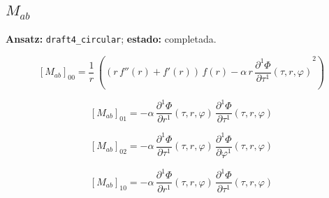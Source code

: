 \documentclass[11pt]{article}
\begin{document}
\subsection*{$ M_{ab} $}
\textbf{Ansatz:} \texttt{draft4\_circular}; \textbf{estado:} completada.\par
\begin{dmath*}[breakdepth={5}]
\left[M_{ab}\right]_{00} = \frac{1}{r}\,\left(\left(r\,f''\!\left(r\right) + f'\!\left(r\right)\right)\,f\!\left(r\right) - \alpha\,r\,{\frac{\partial^{1} \Phi}{\partial \tau^{1}}\!\left(\tau, r, \varphi\right)}^{2}\right)
\end{dmath*}
\par\smallskip
\begin{dmath*}[breakdepth={5}]
\left[M_{ab}\right]_{01} = -\alpha\,\frac{\partial^{1} \Phi}{\partial r^{1}}\!\left(\tau, r, \varphi\right)\,\frac{\partial^{1} \Phi}{\partial \tau^{1}}\!\left(\tau, r, \varphi\right)
\end{dmath*}
\par\smallskip
\begin{dmath*}[breakdepth={5}]
\left[M_{ab}\right]_{02} = -\alpha\,\frac{\partial^{1} \Phi}{\partial \tau^{1}}\!\left(\tau, r, \varphi\right)\,\frac{\partial^{1} \Phi}{\partial \varphi^{1}}\!\left(\tau, r, \varphi\right)
\end{dmath*}
\par\smallskip
\begin{dmath*}[breakdepth={5}]
\left[M_{ab}\right]_{10} = -\alpha\,\frac{\partial^{1} \Phi}{\partial r^{1}}\!\left(\tau, r, \varphi\right)\,\frac{\partial^{1} \Phi}{\partial \tau^{1}}\!\left(\tau, r, \varphi\right)
\end{dmath*}
\par\smallskip
\end{document}
